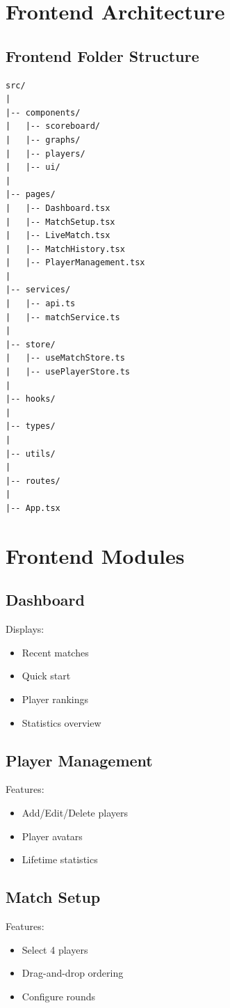 \documentclass[11pt,a4paper]{article}
\begin{document}
\section{Frontend Architecture}

\subsection{Frontend Folder Structure}

\begin{lstlisting}[basicstyle=\ttfamily\small]
src/
|
|-- components/
|   |-- scoreboard/
|   |-- graphs/
|   |-- players/
|   |-- ui/
|
|-- pages/
|   |-- Dashboard.tsx
|   |-- MatchSetup.tsx
|   |-- LiveMatch.tsx
|   |-- MatchHistory.tsx
|   |-- PlayerManagement.tsx
|
|-- services/
|   |-- api.ts
|   |-- matchService.ts
|
|-- store/
|   |-- useMatchStore.ts
|   |-- usePlayerStore.ts
|
|-- hooks/
|
|-- types/
|
|-- utils/
|
|-- routes/
|
|-- App.tsx
\end{lstlisting}

\section{Frontend Modules}

\subsection{Dashboard}
Displays:
\begin{itemize}
    \item Recent matches
    \item Quick start
    \item Player rankings
    \item Statistics overview
\end{itemize}

\subsection{Player Management}
Features:
\begin{itemize}
    \item Add/Edit/Delete players
    \item Player avatars
    \item Lifetime statistics
\end{itemize}

\subsection{Match Setup}
Features:
\begin{itemize}
    \item Select 4 players
    \item Drag-and-drop ordering
    \item Configure rounds
\end{itemize}
\end{document}
